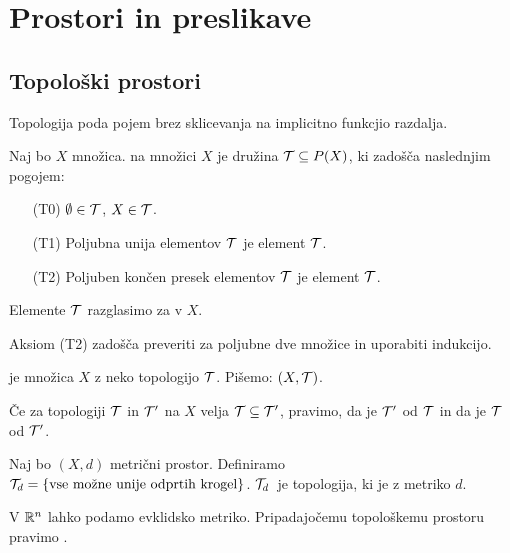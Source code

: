 \section{Prostori in preslikave}
\subsection{Topološki prostori}
Topologija poda pojem  brez sklicevanja na implicitno funkcjio razdalja.

\begin{definicija}
    Naj bo $X$ množica.  na množici $X$ je družina $\mathcal{T} \subseteq P(X)$, ki zadošča naslednjim pogojem:
    \begin{enumerate}
        \item[(T0)] $\emptyset \in \mathcal{T}$, $X \in \mathcal{T}$.
        \item[(T1)] Poljubna unija elementov $\mathcal{T}$ je element $\mathcal{T}$.
        \item[(T2)] Poljuben končen presek elementov $\mathcal{T}$ je element $\mathcal{T}$.
    \end{enumerate}
    Elemente $\mathcal{T}$ razglasimo za  v $X$.
\end{definicija}

\begin{opomba}
    Aksiom (T2) zadošča preveriti za poljubne dve množice in uporabiti indukcijo.
\end{opomba}

\begin{definicija}
     je množica $X$ z neko topologijo $\mathcal{T}$. Pišemo: $(X, \mathcal{T})$.
\end{definicija}

\begin{definicija}
    Če za topologiji $\mathcal{T}$ in $\mathcal{T}'$ na $X$ velja $\mathcal{T} \subseteq \mathcal{T}'$, pravimo, da je $\mathcal{T}'$  od $\mathcal{T}$ in da je $\mathcal{T}$  od $\mathcal{T}'$. 
\end{definicija}

\begin{primer}
    Naj bo $(X, d)$ metrični prostor. Definiramo $\mathcal{T}_d = \left\{\text{vse možne unije odprtih krogel}\right\}$. $\mathcal{T}_d$~je topologija, ki je  z metriko $d$.
\end{primer}

\begin{primer}
    V $\mathbb{R}^n$ lahko podamo evklidsko metriko. Pripadajočemu topološkemu prostoru pravimo .
\end{primer}

